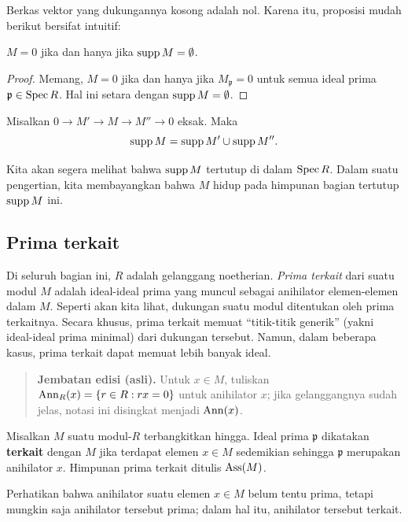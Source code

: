 Berkas vektor yang dukungannya kosong adalah nol. Karena itu, proposisi mudah
berikut bersifat intuitif:

\begin{proposition} 
$M = 0$ jika dan hanya jika $\operatorname{supp} M = \emptyset$. 
\end{proposition}
\begin{proof} 
Memang, $M=0$ jika dan hanya jika $M_{\mathfrak{p}} = 0$ untuk semua ideal prima
$\mathfrak{p} \in \operatorname{Spec} R$. Hal ini setara dengan $\operatorname{supp} M = \emptyset$.
\end{proof} 
 
\begin{exercise} 
Misalkan $0 \to M' \to M \to M'' \to 0$ eksak. Maka 
\[ \operatorname{supp} M = \operatorname{supp} M' \cup \operatorname{supp} M''.  \]
\end{exercise} 


Kita akan segera melihat bahwa $\operatorname{supp} M$ tertutup di dalam $\operatorname{Spec} R$. Dalam suatu
pengertian, kita membayangkan bahwa $M$ hidup pada himpunan bagian tertutup $\operatorname{supp} M$ ini.



\subsection{Prima terkait}
Di seluruh bagian ini, $R$ adalah gelanggang noetherian. \emph{Prima
terkait} dari suatu modul $M$ adalah ideal-ideal prima yang muncul sebagai anihilator
elemen-elemen dalam $M$. Seperti akan kita lihat, dukungan suatu modul ditentukan oleh
prima terkaitnya. Secara khusus, prima terkait memuat “titik-titik generik”
(yakni ideal-ideal prima minimal) dari dukungan tersebut. Namun, dalam beberapa kasus,
prima terkait dapat memuat lebih banyak ideal. 

\begin{quote}\small\textbf{Jembatan edisi (asli).}
Untuk $x\in M$, tuliskan
$\operatorname{Ann}_R(x)=\{r\in R:rx=0\}$ untuk anihilator $x$; jika gelanggangnya
sudah jelas, notasi ini disingkat menjadi $\operatorname{Ann}(x)$.\end{quote}

\begin{definition} 
Misalkan $M$ suatu modul-$R$ terbangkitkan hingga. Ideal prima $\mathfrak{p}$ dikatakan
\textbf{terkait} dengan $M$ jika terdapat elemen $x \in M$ sedemikian sehingga
$\mathfrak{p}$ merupakan anihilator $x$. Himpunan prima terkait ditulis
$\operatorname{Ass}(M)$.
\end{definition} 

Perhatikan bahwa anihilator suatu elemen $x \in M$ belum tentu prima, tetapi
mungkin saja anihilator tersebut prima; dalam hal itu, anihilator tersebut
terkait.

